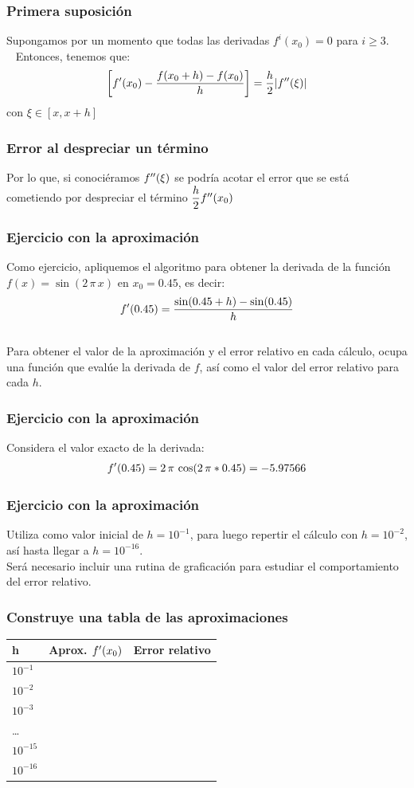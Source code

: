 \documentclass[12pt]{beamer}
\begin{document}
\begin{frame}
\frametitle{Primera suposición}
Supongamos por un momento que todas las derivadas $f^{i}(x_{0}) = 0$ para $i \geq 3$.
\\\
\bigskip
\pause
Entonces, tenemos que:
\begin{align*}
\left[ {f}^{\prime} (x_{0}) - \dfrac{f (x_{0} + h) - f (x_{0})}{h} \right] = \dfrac{h}{2} \abs{ {f}^{\prime \prime} (\xi) }
\end{align*}
con $\xi \in [x, x + h]$
\end{frame}
\begin{frame}
\frametitle{Error al despreciar un término}
Por lo que, si conociéramos ${f}^{\prime \prime} (\xi)$ se podría acotar el error que se está cometiendo por despreciar el término $\dfrac{h}{2} {f}^{\prime \prime} (x_{0})$
\end{frame}
\begin{frame}
\frametitle{Ejercicio con la aproximación}
Como ejercicio, apliquemos el algoritmo para obtener la derivada de la función $f (x) = \sin(2 \, \pi \,  x)$ en $x_{0} = 0.45$, es decir:
\begin{align*}
{f}^{\prime} (0.45) = \dfrac{\sin (0.45 + h) - \sin (0.45)}{h}
\end{align*}
\\
\bigskip
\pause
Para obtener el valor de la aproximación y el error relativo en cada cálculo, ocupa una función que evalúe la derivada de $f$, así como el valor del error relativo para cada $h$.
\end{frame}
\begin{frame}
\frametitle{Ejercicio con la aproximación}
Considera el valor exacto de la derivada:
\begin{align*}
{f}^{\prime} (0.45) = 2 \, \pi \, \cos(2 \, \pi * 0.45) = -5.97566
\end{align*}
\end{frame}
\begin{frame}
\frametitle{Ejercicio con la aproximación}
Utiliza como valor inicial de $h = 10^{-1}$, para luego repertir el cálculo con $h = 10^{-2}$, así hasta llegar a $h = 10^{-16}$.
\\
\bigskip
\pause
Será necesario incluir una rutina de graficación para estudiar el comportamiento del error relativo.
\end{frame}
\begin{frame}
\frametitle{Construye una tabla de las aproximaciones}
\begin{table}
\renewcommand{\arraystretch}{0.9}
\centering
\begin{tabular}{l | l | l}
h & Aprox. ${f}^{\prime} (x_{0})$ & Error relativo\\ \hline
$10^{-1}$ & & \\ \hline
$10^{-2}$ & & \\ \hline
$10^{-3}$ & & \\ \hline
\ldots & & \\ \hline
$10^{-15}$ & & \\ \hline
$10^{-16}$ & & \\ \hline
\end{tabular}
\end{table}
\end{frame}
\end{document}

